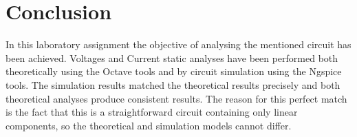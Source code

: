 \section{Conclusion}
\label{sec:conclusion}

In this laboratory assignment the objective of analysing the mentioned circuit has been
achieved. Voltages and Current static analyses have been performed both
theoretically using the Octave tools and by circuit simulation using the
Ngspice tools. The simulation results matched the theoretical results
precisely and both theoretical analyses produce consistent results. The reason for this perfect match is the fact that this is a
straightforward circuit containing only linear components, so the theoretical
and simulation models cannot differ.


